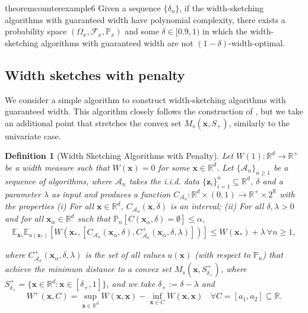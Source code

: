 \documentclass{article} %
\newtheorem{definition}{Definition}[section]
\theoremstyle{remark}
\theoremstyle{definition}      %
\begin{document}
\begin{restatable}{theorem}{counterexample6}\label{prop:counterexample6}
  Given a sequence $\{\delta_n\}$, if the width-sketching algorithms with guaranteed width have polynomial complexity, there exists a probability space $(\Omega_x, \mathcal{F}_x,\mathbb{P}_x)$ and some $\delta \in [0.9,1)$ in which the width-sketching algorithms with guaranteed width are not $(1 - \delta)$-width-optimal. 
\end{restatable}

\subsection{Width sketches with penalty} \label{sec:width_penalty}
We consider a simple algorithm to construct width-sketching algorithms with guaranteed width. This algorithm closely follows the construction of \cite{angelopoulos2024conformal}, but we take an additional point that stretches the convex set $M_s(\bm{x},S_+)$, similarly to the univariate case. 
\begin{definition}[Width Sketching Algorithms with Penalty] \label{def:width_sketch_penalty}
  Let $W(1) : \mathbb{R}^d \rightarrow \mathbb{R}^+$ be a width measure such that $W(\bm{x}) = 0$ for some  $\bm{x} \in \mathbb{R}^d$. Let $\{\mathcal{A}_n\}_{n \geq 1}$ be a sequence of algorithms, where $\mathcal{A}_n$  takes the i.i.d. data $\{ \bm z_i \}_{i=1}^{n} \subseteq \mathbb{R}^d$, $\delta$ and a parameter $\lambda$ as input and produces a function $C_{\mathcal{A}_n}: \mathbb{R}^d \times (0,1) \rightarrow \mathbb{R}^+ \times 2^{\mathbb{R}}$ with the properties (i) For all $\bm{x} \in \mathbb{R}^d$, $C_{\mathcal{A}_n}(\bm{x},\delta)$ is an interval; (ii)  For all $\delta, \lambda > 0$ and for all $\bm{x}_\alpha \in \mathbb{R}^d$ such that $\mathbb{P}_n[ C(\bm{x}_\alpha,\delta) = \emptyset] \leq \alpha$, 
    \begin{align}\label{meas_width_pen}
      \mathbb{E}_{\bm{x}_*} \mathbb{E}_{u(\bm{x_*})}\left[W(\bm{x}_*,[C_{\mathcal{A}_n}(\bm{x}_\alpha,\delta),C^+_{\mathcal{A}_n}(\bm{x}_\alpha,\delta,\lambda)]) \right]  \leq W(\bm{x}_*) + \lambda ~ \forall n \geq 1,
\end{align}

where $C^+_{\mathcal{A}_n}(\bm{x}_\alpha,\delta,\lambda)$ is the set of all values $u(\bm{x})$ (with respect to $\mathbb{P}_n$) that achieve the minimum distance to a convex set $M_s(\bm{x},S^+_{\delta_{+}})$, 
where $S^+_{\delta_{+}} = \{\bm{x} \in \mathbb{R}^d : \bm{x} \in [\delta_+,1]\}$, and we take $\delta_+ := \delta - \lambda$ and 
\begin{equation}
  W^+(\bm{x},C) = \sup_{\bm{x} \in \mathbb{R}^d} W(\bm{x},\bm{x}) - \inf_{\bm{x} \in C} W(\bm{x},\bm{x}) ~~~~ \forall C = [a_1,a_2] \subseteq \mathbb{R}.
\end{equation}
\end{definition}
\end{document}
